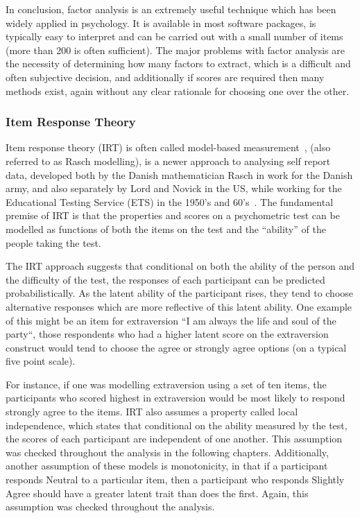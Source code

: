 In conclusion, factor analysis is an extremely useful technique which has been widely applied in psychology. It is available in most software packages, is typically easy to interpret and can be carried out with a small number of items (more than 200 is often sufficient). The major problems with factor analysis are the necessity of determining how many factors to extract, which is a difficult and often subjective decision, and additionally if scores are required then many methods exist, again without any clear rationale for choosing one over the other.  

\subsubsection{Item Response Theory}
\label{sec:item-response-theory}
Item response theory (IRT) is often called model-based measurement~\cite{fischer1995rasch}, (also referred to as Rasch modelling), is a newer approach to analysing self report data, developed both by the Danish mathematician Rasch in work for the Danish army, and also separately by Lord and Novick in the US, while working for the Educational Testing Service (ETS) in the 1950's and 60's~\cite{van1997handbook}.
The fundamental premise of IRT is that the properties and scores on a psychometric test can be modelled as functions of both the items on the test and the ``ability'' of the people taking the test.

The IRT approach suggests that conditional on both the ability of the person and the difficulty of the test, the responses of each participant can be predicted probabilistically. As the latent ability of the participant rises, they tend to choose alternative responses which are more reflective of this latent ability. One example of this might be an item for extraversion ``I am always the life and soul of the party``, those respondents who had a higher latent score on the extraversion construct would tend to choose the agree or strongly agree options (on a typical five point scale). 

For instance, if one was modelling extraversion using a set of ten items, the participants who scored highest in extraversion would be most likely to respond strongly agree to the items.  IRT also assumes a property called local independence, which states that conditional on the ability measured by the test, the scores of each participant are independent of one another. This assumption was checked throughout the analysis in the following chapters. Additionally, another assumption of these models is monotonicity, in that if a participant responds Neutral to a particular item, then a participant who responds Slightly Agree should have a greater latent trait than does the first. Again, this assumption was checked throughout the analysis. 

